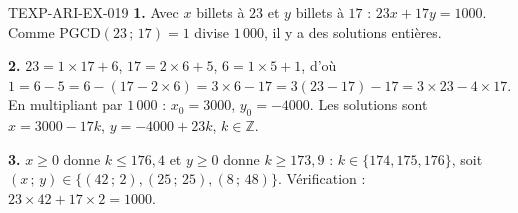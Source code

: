\begin{corrige}{TEXP-ARI-EX-019}
\textbf{1.} Avec $x$ billets à $23$ et $y$ billets à $17$ :
$23x+17y=1000$. Comme $\mathrm{PGCD}(23\,;\,17)=1$ divise $1\,000$, il y a des
solutions entières.

\textbf{2.} $23=1\times17+6$, $17=2\times6+5$, $6=1\times5+1$, d'où
$1=6-5=6-(17-2\times6)=3\times6-17=3(23-17)-17=3\times23-4\times17$.
En multipliant par $1\,000$ : $x_0=3000$, $y_0=-4000$. Les solutions sont
$x=3000-17k$, $y=-4000+23k$, $k\in\mathbb{Z}$.

\textbf{3.} $x\geq0$ donne $k\leq176{,}4$ et $y\geq0$ donne $k\geq173{,}9$ :
$k\in\{174,175,176\}$, soit $(x\,;\,y)\in\{(42\,;\,2),(25\,;\,25),(8\,;\,48)\}$.
Vérification : $23\times42+17\times2=1000$.
\end{corrige}
